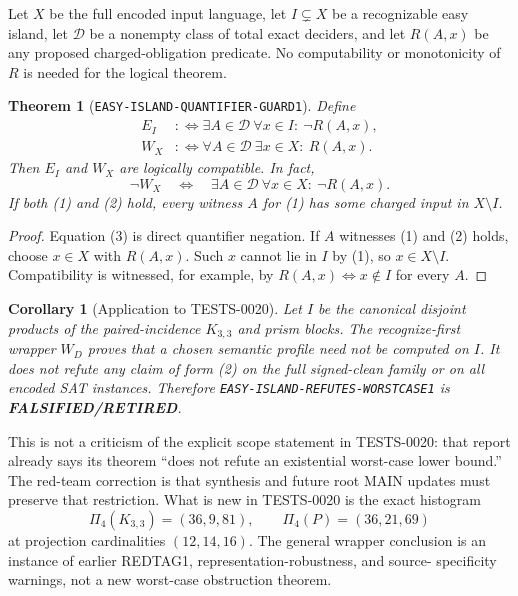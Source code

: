 \documentclass[11pt]{article}
\newtheorem{theorem}{Theorem}
\newtheorem{corollary}{Corollary}
\newcommand{\RETIRED}{\textbf{FALSIFIED/RETIRED}}
\begin{document}
Let $X$ be the full encoded input language, let $I\subsetneq X$ be a
recognizable easy island, let $\mathcal D$ be a nonempty class of total exact
deciders, and let $R(A,x)$ be any proposed charged-obligation predicate.  No
computability or monotonicity of $R$ is needed for the logical theorem.

\begin{theorem}[\texttt{EASY-ISLAND-QUANTIFIER-GUARD1}]
Define
\begin{align}
 E_I &:\Longleftrightarrow
   \exists A\in\mathcal D\ \forall x\in I:\ \neg R(A,x), \tag{1}\\
 W_X &:\Longleftrightarrow
   \forall A\in\mathcal D\ \exists x\in X:\ R(A,x). \tag{2}
\end{align}
Then $E_I$ and $W_X$ are logically compatible.  In fact,
\[
 \neg W_X\quad\Longleftrightarrow\quad
 \exists A\in\mathcal D\ \forall x\in X:\ \neg R(A,x). \tag{3}
\]
If both (1) and (2) hold, every witness $A$ for (1) has some charged input in
$X\setminus I$.
\end{theorem}

\begin{proof}
Equation (3) is direct quantifier negation.  If $A$ witnesses (1) and (2)
holds, choose $x\in X$ with $R(A,x)$.  Such $x$ cannot lie in $I$ by (1), so
$x\in X\setminus I$.  Compatibility is witnessed, for example, by
$R(A,x)\Longleftrightarrow x\notin I$ for every $A$.
\end{proof}

\begin{corollary}[Application to TESTS-0020]
Let $I$ be the canonical disjoint products of the paired-incidence
$K_{3,3}$ and prism blocks.  The recognize-first wrapper $W_D$ proves that a
chosen semantic profile need not be computed on $I$.  It does not refute any
claim of form (2) on the full signed-clean family or on all encoded SAT
instances.  Therefore \texttt{EASY-ISLAND-REFUTES-WORSTCASE1} is \RETIRED.
\end{corollary}

This is not a criticism of the explicit scope statement in TESTS-0020: that
report already says its theorem ``does not refute an existential worst-case
lower bound.''  The red-team correction is that synthesis and future root
MAIN updates must preserve that restriction.  What is new in TESTS-0020 is
the exact histogram
\[
 \Pi_4(K_{3,3})=(36,9,81),\qquad
 \Pi_4(P)=(36,21,69) \tag{4}
\]
at projection cardinalities $(12,14,16)$.  The general wrapper conclusion is
an instance of earlier REDTAG1, representation-robustness, and source-
specificity warnings, not a new worst-case obstruction theorem.
\end{document}
